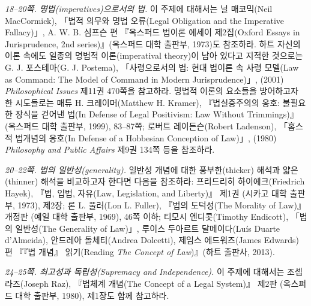 \documentclass[12pt, oneside]{book}  %
\begin{document}
\emph{18--20쪽. 명법(imperatives)으로서의 법.} 이 주제에 대해서는 닐
매코믹(Neil MacCormick), 「법적 의무와 명법 오류(Legal Obligation and
the Imperative Fallacy)」, A. W. B. 심프슨 편 『옥스퍼드 법이론 에세이
제2집(Oxford Essays in Jurisprudence, 2nd series)』(옥스퍼드 대학
출판부, 1973)도 참조하라. 하트 자신의 이론 속에도 일종의 명법적
이론(imperatival theory)이 남아 있다고 지적한 것으로는 G. J. 포스테마(G.
J. Postema), 「사령으로서의 법: 현대 법이론 속 사령 모델(Law as Command:
The Model of Command in Modern Jurisprudence)」, (2001)
\emph{Philosophical Issues} 제11권 470쪽을 참고하라. 명법적 이론의
요소들을 방어하고자 한 시도들로는 매튜 H. 크레이머(Matthew H. Kramer),
『법실증주의의 옹호: 불필요한 장식을 걷어낸 법(In Defense of Legal
Positivism: Law Without Trimmings)』(옥스퍼드 대학 출판부, 1999),
83--87쪽; 로버트 레이든슨(Robert Ladenson), 「홉스적 법개념의 옹호(In
Defense of a Hobbesian Conception of Law)」, (1980) \emph{Philosophy and
Public Affairs} 제9권 134쪽 등을 참조하라.

\emph{20--22쪽. 법의 일반성(generality).} 일반성 개념에 대한
풍부한(thicker) 해석과 얇은(thinner) 해석을 비교하고자 한다면 다음을
참조하라: 프리드리히 하이에크(Friedrich Hayek), 『법, 입법, 자유(Law,
Legislation, and Liberty)』 제1권 (시카고 대학 출판부, 1973), 제2장; 론
L. 풀러(Lon L. Fuller), 『법의 도덕성(The Morality of Law)』 개정판
(예일 대학 출판부, 1969), 46쪽 이하; 티모시 엔디콧(Timothy Endicott),
「법의 일반성(The Generality of Law)」, 루이스 두아르트 달메이다(Luís
Duarte d'Almeida), 안드레아 돌체티(Andrea Dolcetti), 제임스
에드워즈(James Edwards) 편 『『법 개념』 읽기(Reading \emph{The Concept
of Law})』(하트 출판사, 2013).

\emph{24--25쪽. 최고성과 독립성(Supremacy and Independence).} 이 주제에
대해서는 조셉 라즈(Joseph Raz), 『법체계 개념(The Concept of a Legal
System)』 제2판 (옥스퍼드 대학 출판부, 1980), 제1장도 함께 참고하라.
\end{document}
